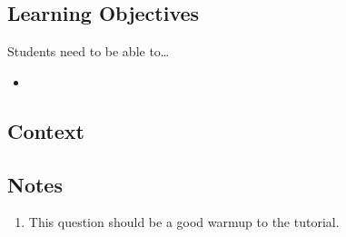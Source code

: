 \subsection*{Learning Objectives}
Students need to be able to\ldots
\begin{itemize}
	\item  
\end{itemize}

\subsection*{Context}

\subsection*{Notes}
\begin{enumerate}
	\item This question should be a good warmup to the tutorial. 
\end{enumerate}